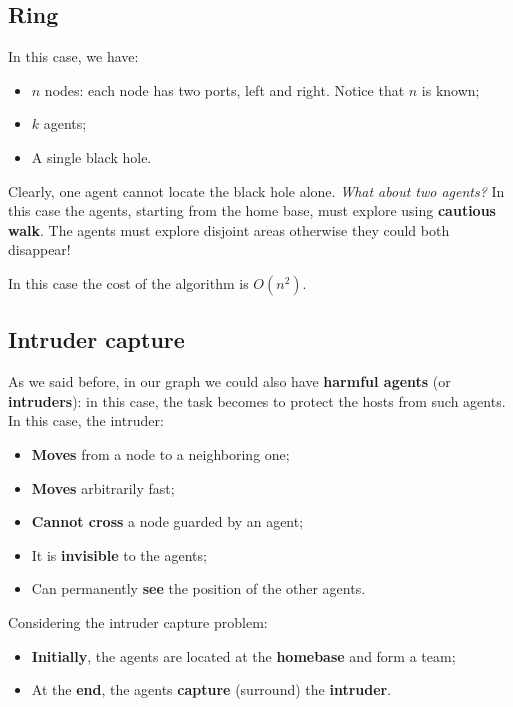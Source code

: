 \subsection{Ring}
In this case, we have:
\begin{itemize}
    \item $n$ nodes: each node has two ports, left and right. Notice that $n$ is known;
    \item $k$ agents;
    \item A single black hole.
\end{itemize}

Clearly, one agent cannot locate the black hole alone. \textit{What about two agents?} In this case the agents, starting from the home base, must explore using \textbf{cautious walk}. The agents must explore disjoint areas otherwise they could both disappear!


In this case the cost of the algorithm is $O(n^2)$.

\subsection{Intruder capture}
As we said before, in our graph we could also have \textbf{harmful agents} (or \textbf{intruders}): in this case, the task becomes to protect the hosts from such agents. In this case, the intruder:
\begin{itemize}
    \item \textbf{Moves} from a node to a neighboring one;
    \item \textbf{Moves} arbitrarily fast;
    \item \textbf{Cannot cross} a node guarded by an agent;
    \item It is \textbf{invisible} to the agents;
    \item Can permanently \textbf{see} the position of the other agents.
\end{itemize}

Considering the intruder capture problem:
\begin{itemize}
    \item \textbf{Initially}, the agents are located at the \textbf{homebase} and form a team;
    \item At the \textbf{end}, the agents \textbf{capture} (surround) the \textbf{intruder}.
\end{itemize}

